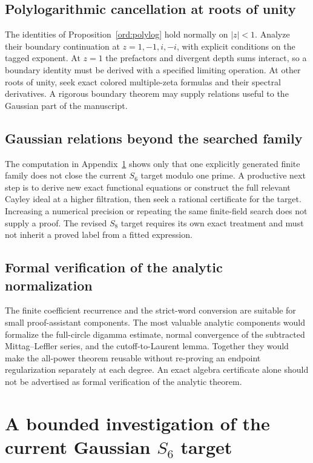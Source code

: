 \documentclass[11pt,a4paper]{article}
\numberwithin{equation}{section}
\theoremstyle{definition}
\theoremstyle{remark}
\begin{document}
\subsection{Polylogarithmic cancellation at roots of unity}

The identities of Proposition~\ref{ord:polylog} hold normally on
$|z|<1$.  Analyze their boundary continuation at $z=1,-1,i,-i$,
with explicit conditions on the tagged exponent.  At $z=1$ the
prefactors and divergent depth sums interact, so a boundary identity
must be derived with a specified limiting operation.  At other roots
of unity, seek exact colored multiple-zeta formulas and their
spectral derivatives.  A rigorous boundary theorem may supply
relations useful to the Gaussian part of the manuscript.

\subsection{Gaussian relations beyond the searched family}

The computation in Appendix~\ref{app:s6} shows only that one
explicitly generated finite family does not close the current
$S_6$ target modulo one prime.  A productive next step is to derive
new exact functional equations or construct the full relevant
Cayley ideal at a higher filtration, then seek a rational
certificate for the target.  Increasing a numerical precision or
repeating the same finite-field search does not supply a proof.
The revised $S_8$ target requires its own exact treatment and must
not inherit a proved label from a fitted expression.

\subsection{Formal verification of the analytic normalization}

The finite coefficient recurrence and the strict-word conversion
are suitable for small proof-assistant components.  The most
valuable analytic components would formalize the full-circle
digamma estimate, normal convergence of the subtracted
Mittag--Leffler series, and the cutoff-to-Laurent lemma.
Together they would make the all-power theorem reusable without
re-proving an endpoint regularization separately at each degree.
An exact algebra certificate alone should not be advertised as
formal verification of the analytic theorem.

\appendix
\section{A bounded investigation of the current Gaussian \texorpdfstring{$S_6$}{S6} target}
\label{app:s6}
\end{document}
